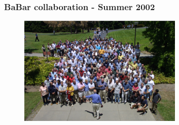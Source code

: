 \begin{frame}
\frametitle{BaBar collaboration - Summer 2002}

\begin{figure}[htbp]
\begin{center}
\includegraphics[width=0.7\textwidth]{images/babar-summer-2002.png}
\end{center}
\end{figure}


\end{frame}


